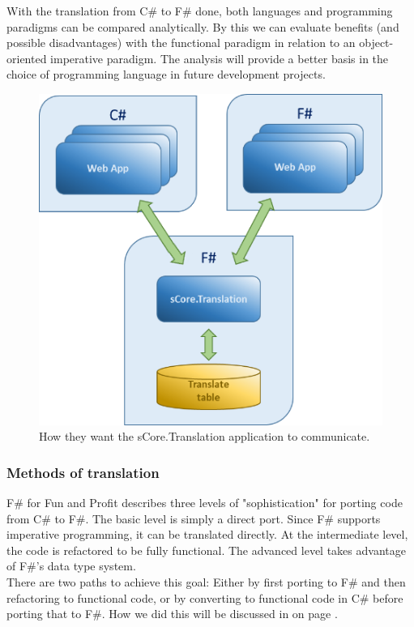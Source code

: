 \documentclass[12pt, a4paper]{article}
\begin{document}
With the translation from C\# to F\# done, both languages and programming paradigms can be compared analytically. By this we can evaluate benefits (and possible disadvantages) with the functional paradigm in relation to an object-oriented imperative paradigm. The analysis will provide a better basis in the choice of programming language in future development projects.

\begin{figure}[!h]
    \includegraphics[scale=0.5]{image02}
    \centering
    \caption{How they want the sCore.Translation application to communicate.}
\end{figure}

\newpage
\subsubsection{Methods of translation}
F\# for Fun and Profit describes three levels of "sophistication" for porting code from C\# to F\#. The basic level is simply a direct port. Since F\# supports imperative programming, it can be translated directly. At the intermediate level, the code is refactored to be fully functional. The advanced level takes advantage of F\#’s data type system.\\

There are two paths to achieve this goal: Either by first porting to F\# and then refactoring to functional code, or by converting to functional code in C\# before porting that to F\#. How we did this will be discussed in  on page \pageref{Solution}.
\end{document}

